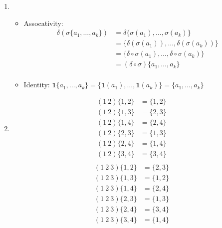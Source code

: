 \documentclass{article}
\newcommand{\set}[1]{ \{ #1 \} }
\newcommand{\id}{ \bm{1} }
\newcommand{\comp}{ \circ }
\begin{document}
\subsubsection{}\label{ex7p8}
\begin{enumerate}
\item 
\begin{itemize}
\item Assocativity:
\begin{align*}
\delta(\sigma\set{a_1,\ldots,a_k}) &= \delta\set{\sigma(a_1),\ldots,\sigma(a_k)}\\
&= \set{\delta(\sigma(a_1)),\ldots,\delta(\sigma(a_k))}\\
&= \set{\delta\comp\sigma(a_1),\ldots,\delta\comp\sigma(a_k)}\\
&= (\delta\comp\sigma)\set{a_1,\ldots,a_k}\\
\end{align*}
\item Identity: $\id\set{a_1,\ldots,a_k} = \set{\id(a_1),\ldots,\id(a_k)} = \set{a_1,\ldots,a_k}$
\end{itemize}
\item
\begin{align*}
(1\ 2)\set{1,2} &= \set{1,2}\\
(1\ 2)\set{1,3} &= \set{2,3}\\
(1\ 2)\set{1,4} &= \set{2,4}\\
(1\ 2)\set{2,3} &= \set{1,3}\\
(1\ 2)\set{2,4} &= \set{1,4}\\
(1\ 2)\set{3,4} &= \set{3,4}\\
\end{align*}
\begin{align*}
(1\ 2\ 3)\set{1,2} &= \set{2,3}\\
(1\ 2\ 3)\set{1,3} &= \set{1,2}\\
(1\ 2\ 3)\set{1,4} &= \set{2,4}\\
(1\ 2\ 3)\set{2,3} &= \set{1,3}\\
(1\ 2\ 3)\set{2,4} &= \set{3,4}\\
(1\ 2\ 3)\set{3,4} &= \set{1,4}\\
\end{align*}
\end{enumerate}
\subsubsection{}\label{ex7p9}
\subsubsection{}\label{ex7p10}
\end{document}
